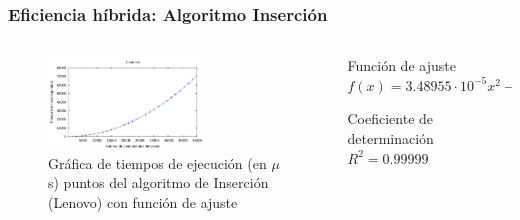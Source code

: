 \documentclass[8pt, aspectratio=169]{beamer}
\begin{document}
    \begin{frame}
        \frametitle{Eficiencia híbrida: Algoritmo Inserción}

        \begin{columns}
            \begin{column}{0.7\textwidth}
                \begin{figure}
                    \includegraphics[width=0.65\textwidth]{../data/lenovo/insercion-graph.pdf}
                    \caption{Gráfica de tiempos de ejecución (en $\mu$s) puntos del algoritmo de Inserción (Lenovo) con función de ajuste}
                \end{figure}
            \end{column}

            \begin{column}{0.3\textwidth}
                \begin{block}{Función de ajuste}
                    $f(x) =3.48955 \cdot 10^{-5} x^{2} - 0.000620098 x + 48.0855$
                \end{block}

                \begin{block}{Coeficiente de determinación}
                    $R^2 = 0.99999$
                \end{block}
            \end{column}
        \end{columns}
    \end{frame}
\end{document}

